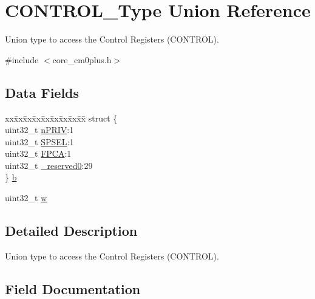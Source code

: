 \hypertarget{union_c_o_n_t_r_o_l___type}{}\section{C\+O\+N\+T\+R\+O\+L\+\_\+\+Type Union Reference}
\label{union_c_o_n_t_r_o_l___type}


Union type to access the Control Registers (C\+O\+N\+T\+R\+OL).  




{\ttfamily \#include $<$core\+\_\+cm0plus.\+h$>$}

\subsection*{Data Fields}
\begin{DoxyCompactItemize}
\item 
\begin{tabbing}
xx\=xx\=xx\=xx\=xx\=xx\=xx\=xx\=xx\=\kill
struct \{\\
\>uint32\_t \mbox{\hyperlink{union_c_o_n_t_r_o_l___type_a2a6e513e8a6bf4e58db169e312172332}{nPRIV}}:1\\
\>uint32\_t \mbox{\hyperlink{union_c_o_n_t_r_o_l___type_ae185aac93686ffc78e998a9daf41415b}{SPSEL}}:1\\
\>uint32\_t \mbox{\hyperlink{union_c_o_n_t_r_o_l___type_a2518558c090f60161ba4e718a54ee468}{FPCA}}:1\\
\>uint32\_t \mbox{\hyperlink{union_c_o_n_t_r_o_l___type_ac8a6a13838a897c8d0b8bc991bbaf7c1}{\_reserved0}}:29\\
\} \mbox{\hyperlink{union_c_o_n_t_r_o_l___type_aff56a666ec2d7b7d277d2ee2871a66c9}{b}}\\

\end{tabbing}\item 
uint32\+\_\+t \mbox{\hyperlink{union_c_o_n_t_r_o_l___type_ad0fb62e7a08e70fc5e0a76b67809f84b}{w}}
\end{DoxyCompactItemize}


\subsection{Detailed Description}
Union type to access the Control Registers (C\+O\+N\+T\+R\+OL). 

\subsection{Field Documentation}
\mbox{\label{union_c_o_n_t_r_o_l___type_ac8a6a13838a897c8d0b8bc991bbaf7c1}} 
